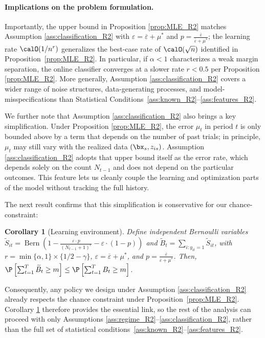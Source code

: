 \documentclass[11pt]{article}
\DeclareMathOperator{\Bern}{Bern}
\newtheorem{corollary}{Corollary}[]
\begin{document}
\paragraph{Implications on the problem formulation.}

Importantly, the upper bound in Proposition \ref{prop:MLE_R2} matches Assumption \ref{ass:classification_R2} with $\varepsilon = \overline\varepsilon + \mu^*$ and $p=\frac{\overline\varepsilon}{\overline\varepsilon+\mu^*}$; the learning rate $\calO(1/n^r)$ generalizes the best-case rate of $\calO(\sqrt n)$ identified in Proposition~\ref{prop:MLE_R2}. In particular, if $\alpha<1$ characterizes a weak margin separation, the online classifier converges at a slower rate $r<0.5$ per Proposition \ref{prop:MLE_R2}. More generally, Assumption \ref{ass:classification_R2} covers a wider range of noise structures, data-generating processes, and model-misspecifications than Statistical Conditions~\ref{ass:known_R2}–\ref{ass:features_R2}.

We further note that Assumption \ref{ass:classification_R2} also brings a key simplification. Under Proposition \ref{prop:MLE_R2}, the error $\mu_t$ in period $t$ is only bounded above by a term that depends on the number of past trials; in principle, $\mu_t$ may still vary with the realized data $(\bx_s,z_{is})$. Assumption \ref{ass:classification_R2} adopts that upper bound itself as the error rate, which depends solely on the count $N_{t-1}$ and does not depend on the particular outcomes. This feature lets us cleanly couple the learning and optimization parts of the model without tracking the full history.

The next result confirms that this simplification is conservative for our chance-constraint:
\setcounter{corollary}{0}
\begin{corollary}[Learning environment] \label{cor:learning_R2}
    Define independent Bernoulli variables\\$\widetilde{S}_{it}=\Bern\left(1-\frac{\varepsilon\cdot p}{\left(N_{t-1} + 1\right)^r}-\varepsilon\cdot(1-p)\right)$ and $\widetilde{B}_t = \sum_{i:y_{it}=1} \widetilde{S}_{it}$, with $r=\min\{\alpha,1\} \times \{1/2-\gamma\}$, $\varepsilon = \overline\varepsilon + \mu^*$, and $p = \frac{\overline\varepsilon}{\overline\varepsilon+\mu^*}$. Then, $\P\left[\sum_{t=1}^T\widetilde{B}_t\geq m\right] \leq \P\left[\sum_{t=1}^TB_t\geq m\right]$.
\end{corollary}
Consequently, any policy we design under Assumption \ref{ass:classification_R2} already respects the chance constraint under Proposition~\ref{prop:MLE_R2}. Corollary \ref{cor:learning_R2} therefore provides the essential link, so the rest of the analysis can proceed with only Assumptions \ref{ass:regime_R2}--\ref{ass:classification_R2}, rather than the full set of statistical conditions~\ref{ass:known_R2}–\ref{ass:features_R2}.
\end{document}
